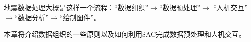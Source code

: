地震数据处理大概是这样一个流程：``数据组织''$\rightarrow$``数据预处理''$\rightarrow$
``人机交互''$\rightarrow$``数据分析''$\rightarrow$``绘制图件''。

本章将介绍数据组织的一些原则以及如何利用SAC完成数据预处理和人机交互。